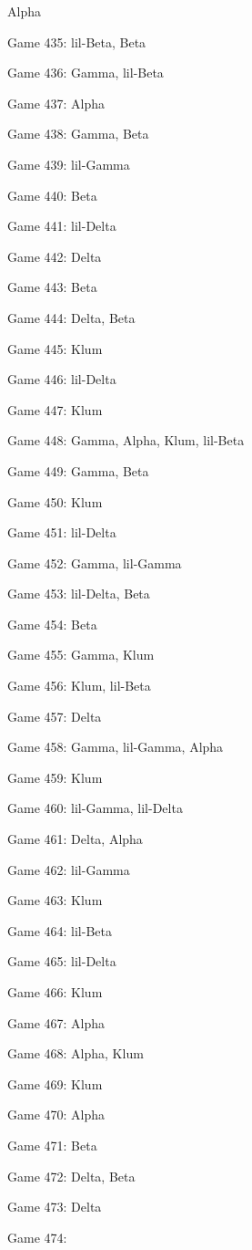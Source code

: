 \documentclass{article}
\begin{document}
\begin{multicols}{3}
\begin{compactitem}
Alpha
\item Game 435:
lil-Beta, Beta
\item Game 436:
Gamma, lil-Beta
\item Game 437:
Alpha
\item Game 438:
Gamma, Beta
\item Game 439:
lil-Gamma
\item Game 440:
Beta
\item Game 441:
lil-Delta
\item Game 442:
Delta
\item Game 443:
Beta
\item Game 444:
Delta, Beta
\item Game 445:
Klum
\item Game 446:
lil-Delta
\item Game 447:
Klum
\item Game 448:
Gamma, Alpha, Klum, lil-Beta
\item Game 449:
Gamma, Beta
\item Game 450:
Klum
\item Game 451:
lil-Delta
\item Game 452:
Gamma, lil-Gamma
\item Game 453:
lil-Delta, Beta
\item Game 454:
Beta
\item Game 455:
Gamma, Klum
\item Game 456:
Klum, lil-Beta
\item Game 457:
Delta
\item Game 458:
Gamma, lil-Gamma, Alpha
\item Game 459:
Klum
\item Game 460:
lil-Gamma, lil-Delta
\item Game 461:
Delta, Alpha
\item Game 462:
lil-Gamma
\item Game 463:
Klum
\item Game 464:
lil-Beta
\item Game 465:
lil-Delta
\item Game 466:
Klum
\item Game 467:
Alpha
\item Game 468:
Alpha, Klum
\item Game 469:
Klum
\item Game 470:
Alpha
\item Game 471:
Beta
\item Game 472:
Delta, Beta
\item Game 473:
Delta
\item Game 474:

\end{compactitem}
\end{multicols}
\end{document}
